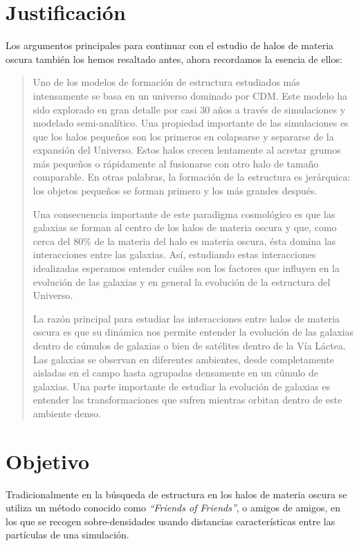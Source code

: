\documentclass[12pt,spanish]{article}
\begin{document}
\section*{Justificación}

Los argumentos principales para continuar con el estudio de halos de
materia oscura también los hemos resaltado antes, ahora recordamos la
esencia de ellos:

\begin{quote}

  
Uno de los modelos de formación de estructura estudiados más 
intensamente se  basa en un universo dominado por CDM. Este modelo ha
sido explorado en gran detalle por casi 30
años a través de simulaciones y modelado semi-analítico. Una 
propiedad importante de las simulaciones es que los halos pequeños 
son los primeros en colapsarse y separarse de la expansión del 
Universo. Estos halos crecen lentamente al acretar
grumos más pequeños o rápidamente al fusionarse con otro halo de 
tamaño comparable. En otras palabras, la formación de la estructura 
es jerárquica: los objetos pequeños se forman primero y los más 
grandes después.

Una consecuencia importante de este paradigma cosmológico es que las
galaxias se forman al centro de los halos de materia  
oscura y que, como cerca del 80\% de la materia del halo es materia 
oscura, ésta domina las interacciones entre las galaxias. 
Así, estudiando estas interacciones idealizadas esperamos entender 
cuáles son los factores que influyen en la evolución de las
galaxias y en general la evolución de la estructura del Universo. 

La razón principal para estudiar las interacciones entre halos 
de materia oscura es que su dinámica nos permite entender la 
evolución de las galaxias dentro de cúmulos de galaxias o bien de 
satélites dentro de la Vía Láctea. Las galaxias se observan en 
diferentes ambientes, desde completamente aisladas en el 
campo hasta agrupadas densamente en un cúmulo de galaxias. Una 
parte importante de estudiar la evolución de galaxias es entender las 
transformaciones que sufren mientras orbitan dentro de este ambiente 
denso.

\end{quote}

\section*{Objetivo}

Tradicionalmente en la búsqueda de estructura en los halos de materia
oscura se utiliza un método conocido como {\it ``Friends of Friends''},
o amigos de amigos, en los que se recogen sobre-densidades usando
distancias características entre las partículas de una simulación.
\end{document}
